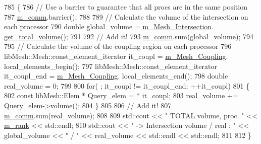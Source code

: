 \begin{DoxyCode}
785     \{
786         \textcolor{comment}{// Use a barrier to guarantee that all procs are in the same position}
787         \hyperlink{classcarl_1_1_intersection___search_a69fe381ecd45f4cdcb4810294aa88eaa}{m\_comm}.barrier();
788 
789         \textcolor{comment}{// Calculate the volume of the intersection on each processor}
790         \textcolor{keywordtype}{double} global\_volume = \hyperlink{classcarl_1_1_intersection___search_a4946b764d66e3f26f323c5d043551c66}{m\_Mesh\_Intersection}.
      \hyperlink{classcarl_1_1_mesh___intersection_a67f126ec639724230b32916b59af4933}{get\_total\_volume}();
791 
792         \textcolor{comment}{// Add it!}
793         \hyperlink{classcarl_1_1_intersection___search_a69fe381ecd45f4cdcb4810294aa88eaa}{m\_comm}.sum(global\_volume);
794 
795         \textcolor{comment}{// Calculate the volume of the coupling region on each processor}
796         libMesh::Mesh::const\_element\_iterator it\_coupl = \hyperlink{classcarl_1_1_intersection___search_adb13a40afa6c1f8db7bb33f68c5b42d2}{m\_Mesh\_Coupling}.
      local\_elements\_begin();
797         libMesh::Mesh::const\_element\_iterator it\_coupl\_end = \hyperlink{classcarl_1_1_intersection___search_adb13a40afa6c1f8db7bb33f68c5b42d2}{m\_Mesh\_Coupling}.
      local\_elements\_end();
798         \textcolor{keywordtype}{double} real\_volume = 0;
799 
800         \textcolor{keywordflow}{for}( ; it\_coupl != it\_coupl\_end; ++it\_coupl)
801         \{
802             \textcolor{keyword}{const} libMesh::Elem * Query\_elem = * it\_coupl;
803             real\_volume += Query\_elem->volume();
804         \}
805 
806         \textcolor{comment}{// Add it!}
807         \hyperlink{classcarl_1_1_intersection___search_a69fe381ecd45f4cdcb4810294aa88eaa}{m\_comm}.sum(real\_volume);
808 
809         std::cout << \textcolor{stringliteral}{"    TOTAL volume, proc. "} << \hyperlink{classcarl_1_1_intersection___search_a82564dfb7815673fcb9d9e3eb2d03b97}{m\_rank} << std::endl;
810         std::cout << \textcolor{stringliteral}{" -> Intersection volume / real    : "} << global\_volume << \textcolor{stringliteral}{" / "} << real\_volume << 
      std::endl << std::endl;
811 
812     \}
\end{DoxyCode}
\hypertarget{classcarl_1_1_intersection___search_a86eef059aabd920fbea11362abfc307f}{}
